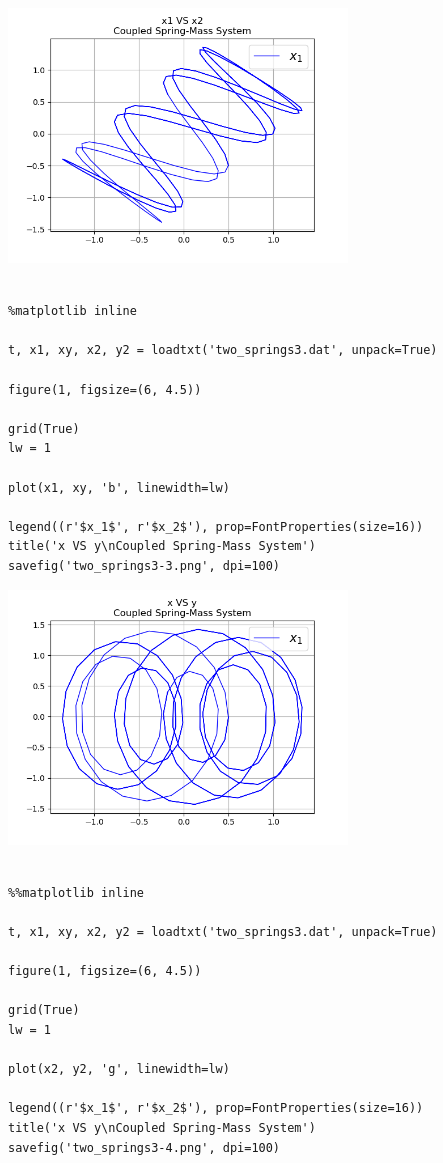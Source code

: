 \documentclass{article} %
\begin{document}
\begin{center}
 	\includegraphics[width=9cm]{two_springs3-2.png}
 \end{center}


\begin{verbatim} 

%matplotlib inline

t, x1, xy, x2, y2 = loadtxt('two_springs3.dat', unpack=True)

figure(1, figsize=(6, 4.5))

grid(True)
lw = 1

plot(x1, xy, 'b', linewidth=lw)

legend((r'$x_1$', r'$x_2$'), prop=FontProperties(size=16))
title('x VS y\nCoupled Spring-Mass System')
savefig('two_springs3-3.png', dpi=100)

\end{verbatim}



\begin{center}
 	\includegraphics[width=9cm]{two_springs3-3.png}
 \end{center}



\begin{verbatim} 

%%matplotlib inline

t, x1, xy, x2, y2 = loadtxt('two_springs3.dat', unpack=True)

figure(1, figsize=(6, 4.5))

grid(True)
lw = 1

plot(x2, y2, 'g', linewidth=lw)

legend((r'$x_1$', r'$x_2$'), prop=FontProperties(size=16))
title('x VS y\nCoupled Spring-Mass System')
savefig('two_springs3-4.png', dpi=100)

\end{verbatim}
\end{document}

